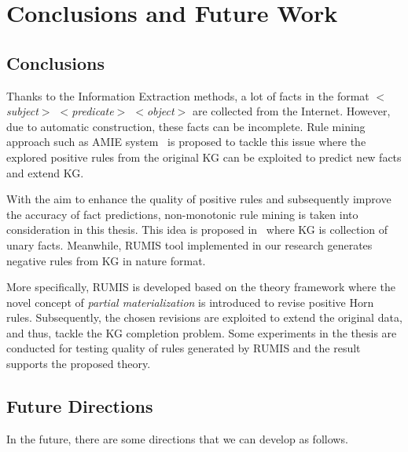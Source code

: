 \chapter{Conclusions and Future Work}
\label{chap:conclusion}

\section{Conclusions}

Thanks to the Information Extraction methods, a lot of facts in the format \textit{$<$subject$>$ $<$predicate$>$ $<$object$>$} are collected from the Internet. However, due to automatic construction, these facts can be incomplete. Rule mining approach such as AMIE system~\cite{ref10} is proposed to tackle this issue where the explored positive rules from the original KG can be exploited to predict new facts and extend KG.

With the aim to enhance the quality of positive rules and subsequently improve the accuracy of fact predictions, non-monotonic rule mining is taken into consideration in this thesis. This idea is proposed in~\cite{ref12} where KG is collection of unary facts. Meanwhile, RUMIS tool implemented in our research generates negative rules from KG in nature format.

More specifically, RUMIS is developed based on the theory framework where the novel concept of \textit{partial materialization} is introduced to revise positive Horn rules. Subsequently, the chosen revisions are exploited to extend the original data, and thus, tackle the KG completion problem. Some experiments in the thesis are conducted for testing quality of rules generated by RUMIS and the result supports the proposed theory.

\section{Future Directions}

In the future, there are some directions that we can develop as follows.

